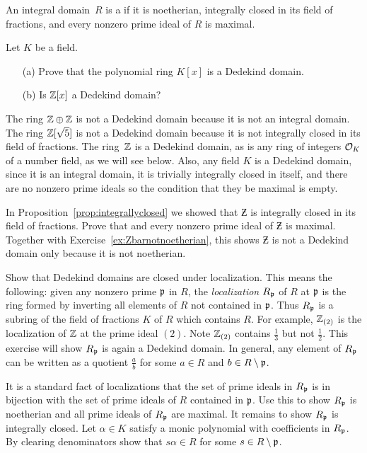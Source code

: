 \begin{definition}
An integral domain~$R$ is a  if it is noetherian,
integrally closed in its field of fractions, and every nonzero prime
ideal of $R$ is maximal.
\end{definition}

\begin{exercise}
Let $K$ be a field.
\begin{enumerate}
\item[(a)] Prove that the polynomial ring $K[x]$ is a Dedekind domain.
\item[(b)] Is $\mathbb{Z}[x]$ a Dedekind domain?
\end{enumerate}
\end{exercise}

The ring $\mathbb{Z}\oplus \mathbb{Z}$ is not a Dedekind domain because it is not an
integral domain.  The ring $\mathbb{Z}[\sqrt{5}]$ is not a Dedekind domain
because it is not integrally closed in its field of fractions.  The
ring~$\mathbb{Z}$ is a Dedekind domain, as is any ring of integers $\mathcal{O}_K$ of a
number field, as we will see below.  Also, any field $K$ is a Dedekind
domain, since it is an integral domain, it is trivially integrally
closed in itself, and there are no nonzero prime ideals so the
condition that they be maximal is empty.

\begin{exercise}
	In Proposition~\ref{prop:integrallyclosed} we showed
	that $\Zbar$ is integrally closed in its field of fractions.
	Prove that and every nonzero prime ideal of $\Zbar$
	is maximal. Together with Exercise~\ref{ex:Zbarnotnoetherian},
	this shows $\Zbar$ is not a Dedekind domain only because it
	is not noetherian.
\end{exercise}

\begin{exercise*}\label{ex:dedekindlocal}
	Show that Dedekind domains are closed under
	localization. This means the following: given
	any nonzero prime $\mathfrak{p}$ in $R$, the \emph{localization}
	$R_{\mathfrak{p}}$ of $R$ at $\mathfrak{p}$ is the ring formed by inverting all
	elements of $R$ not contained in $\mathfrak{p}$. Thus $R_{\mathfrak{p}}$ is a
	subring of the field of fractions $K$ of $R$ which contains
	$R$. For example, $\mathbb{Z}_{(2)}$ is the localization of $\mathbb{Z}$
	at the prime ideal $(2)$. Note $\mathbb{Z}_{(2)}$ contains
	$\frac{1}{3}$ but not $\frac{1}{2}$.
	This exercise will show $R_{\mathfrak{p}}$ is again a Dedekind domain.
	In general, any element of $R_{\mathfrak{p}}$ can be written as a quotient
	$\frac{a}{b}$ for some $a\in R$ and $b\in R\setminus \mathfrak{p}$.

	\begin{hint}
		It is a standard fact of localizations that the
		set of prime ideals in $R_{\mathfrak{p}}$ is in bijection with the set
		of prime ideals of $R$ contained in $\mathfrak{p}$. Use this to show
		$R_{\mathfrak{p}}$ is noetherian and all prime ideals of $R_{\mathfrak{p}}$ are maximal.
		It remains to show $R_{\mathfrak{p}}$ is integrally closed. Let $\alpha\in K$
		satisfy a monic polynomial with coefficients in $R_{\mathfrak{p}}$. By
		clearing denominators show that $s\alpha\in R$ for some
		$s\in R\setminus \mathfrak{p}$.
	\end{hint}
\end{exercise*}

